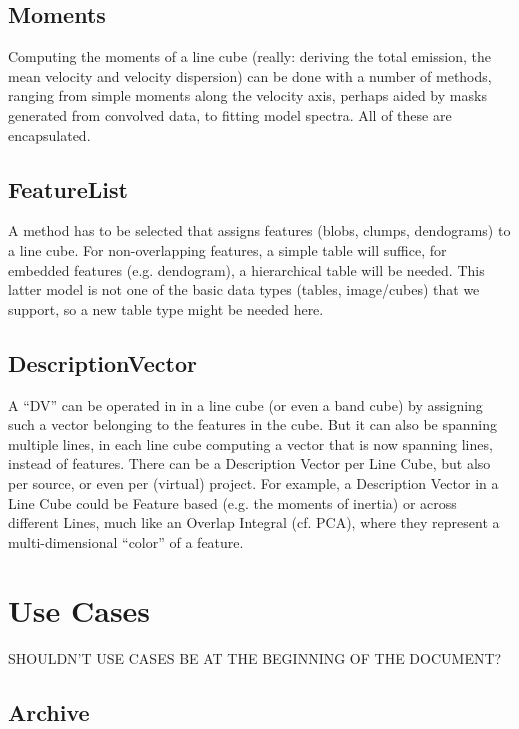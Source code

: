 \documentclass{article}
\begin{document}
\subsection{Moments}

Computing the moments of a line cube (really: deriving the total
emission, the mean velocity and velocity dispersion) can be done
with a number of methods, ranging from simple moments along the
velocity axis, perhaps aided by masks generated from convolved
data, to fitting model spectra. All of these are encapsulated.


\subsection{FeatureList}

A method has to be selected that assigns features  (blobs, clumps, 
dendograms) to a line cube.  For non-overlapping features, a simple
table will suffice, for embedded features (e.g. dendogram),
a hierarchical table will be needed. This latter model is not one of
the basic data types (tables, image/cubes) that we support, so a
new table type might be needed here.

\subsection{DescriptionVector}

A ``DV'' can be operated in in a line cube (or even a band cube) by
assigning such a vector belonging to the features in the cube. But
it can also be spanning multiple lines, in each line cube computing a
vector that is now spanning lines, instead of features.  There can be a
Description Vector per Line Cube, but also per source, or even per (virtual)
project. For example, a Description Vector in a Line Cube could be Feature
based (e.g. the moments of inertia) or across different Lines, much like
an Overlap Integral (cf. PCA), where they represent a multi-dimensional
``color'' of a feature.


\section{Use Cases}

SHOULDN'T USE CASES BE AT THE BEGINNING OF THE DOCUMENT?

\subsection{Archive}
\end{document}

